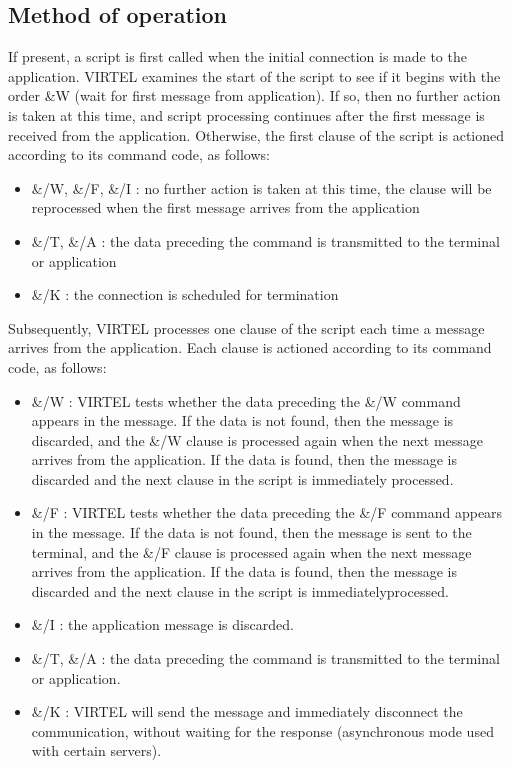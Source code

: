 \documentclass[letterpaper,10pt,english]{sphinxmanual}
\begin{document}
\subsection{Method of operation}
\label{\detokenize{connectivity_guide:method-of-operation}}\label{\detokenize{connectivity_guide:index-121}}
If present, a script is first called when the initial connection is made to the application. VIRTEL examines the start of the script to see if it begins with the order \&W (wait for first message from application). If so, then no further action is taken at this time, and script processing continues after the first message is received from the application. Otherwise, the first clause of the script is actioned according to its command code, as follows:
\begin{itemize}
\item {} 
\&/W, \&/F, \&/I : no further action is taken at this time, the clause will be reprocessed when the first message arrives from the application

\item {} 
\&/T, \&/A : the data preceding the command is transmitted to the terminal or application

\item {} 
\&/K : the connection is scheduled for termination

\end{itemize}

Subsequently, VIRTEL processes one clause of the script each time a message arrives from the application. Each clause is actioned according to its command code, as follows:
\begin{itemize}
\item {} 
\&/W : VIRTEL tests whether the data preceding the \&/W command appears in the message. If the data is not found, then the message is discarded, and the \&/W clause is processed again when the next message arrives from the application. If the data is found, then the message is discarded and the next clause in the script is immediately processed.

\item {} 
\&/F : VIRTEL tests whether the data preceding the \&/F command appears in the message. If the data is not found, then the message is sent to the terminal, and the \&/F clause is processed again when the next message arrives from the application. If the data is found, then the message is discarded and the next clause in the script is immediatelyprocessed.

\item {} 
\&/I : the application message is discarded.

\item {} 
\&/T, \&/A : the data preceding the command is transmitted to the terminal or application.

\item {} 
\&/K : VIRTEL will send the message and immediately disconnect the communication, without waiting for the response (asynchronous mode used with certain servers).

\end{itemize}
\end{document}
